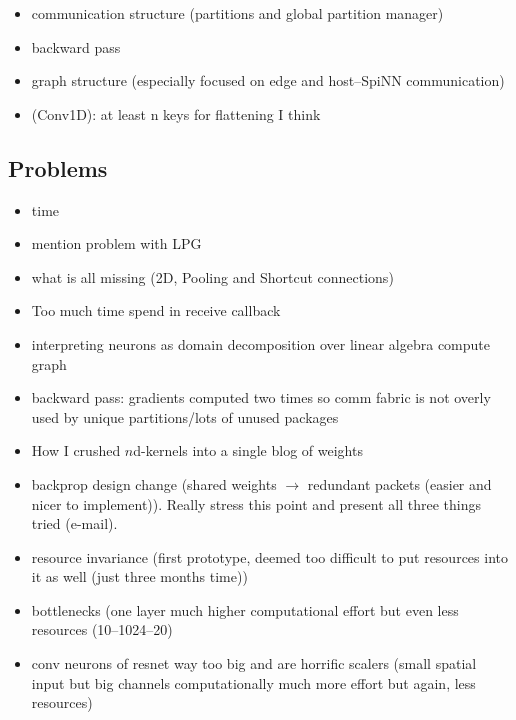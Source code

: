 \documentclass[]{article}
\begin{document}

\begin{itemize}
  \item communication structure (partitions and global partition manager)
  \item backward pass
  \item graph structure (especially focused on edge and host--SpiNN
    communication)
  \item (Conv1D): at least n keys for flattening I think
\end{itemize}



\subsection{Problems} %
\label{subsec:problems}

\begin{itemize}
  \item time
  \item mention problem with LPG
  \item what is all missing (2D, Pooling and Shortcut connections)
  \item Too much time spend in receive callback
  \item interpreting neurons as domain decomposition over linear algebra
    compute graph
  \item backward pass: gradients computed two times so comm fabric is
    not overly used by unique partitions/lots of unused packages
  \item How I crushed $n$d-kernels into a single blog of weights
  \item backprop design change (shared weights $\rightarrow$ redundant
    packets (easier and nicer to implement)).
    Really stress this point and present all three things tried
    (e-mail).
  \item resource invariance (first prototype, deemed too difficult
    to put resources into it as well (just three months time))
  \item bottlenecks (one layer much higher
    computational effort but even less resources (10--1024--20)
  \item conv neurons of resnet way too big and are horrific scalers
    (small spatial input but big channels computationally much more
    effort but again, less resources)
\end{itemize}
\end{document}
